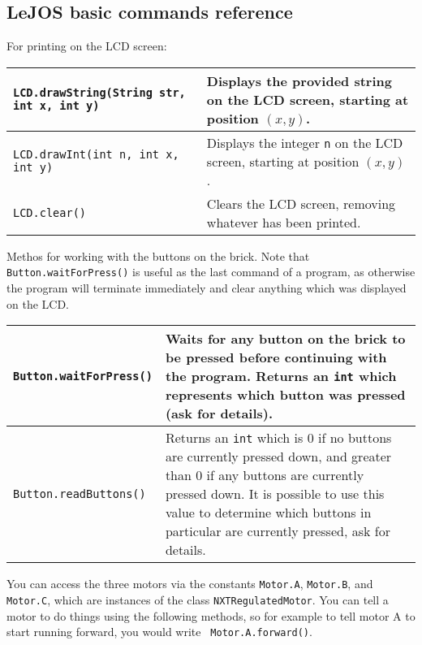 \documentclass[11pt]{article}
\theoremstyle{plain}
\theoremstyle{definition}
\theoremstyle{remark}
\begin{document}
\begin{center}
\section*{LeJOS basic commands reference}
\end{center}
For printing on the LCD screen:
\begin{center}
  \begin{tabular}{|l|p{20em}|}
    \hline
    {\tt LCD.drawString(String str, int x, int y)} & Displays the provided
    string on the LCD screen, starting at position $(x, y)$. \\\hline
    {\tt LCD.drawInt(int n, int x, int y)} & Displays the integer {\tt n} on the
    LCD screen, starting at position $(x, y)$. \\\hline
    {\tt LCD.clear()} & Clears the LCD screen, removing whatever has been
    printed. \\\hline
  \end{tabular}
\end{center}
Methos for working with the buttons on the brick. Note that {\tt
Button.waitForPress()} is useful as the last command of a program, as otherwise
the program will terminate immediately and clear anything which was displayed on
the LCD.
\begin{center}
  \begin{tabular}{|l|p{20em}|}
    \hline
    {\tt Button.waitForPress()} & Waits for any button on the brick to be
    pressed before continuing with the program. Returns an {\tt int} which
    represents which button was pressed (ask for details). \\\hline
    {\tt Button.readButtons()} & Returns an {\tt int} which is $0$ if no buttons
    are currently pressed down, and greater than $0$ if any buttons are
    currently pressed down. It is possible to use this value to determine which
    buttons in particular are currently pressed, ask for details. \\\hline
  \end{tabular}
\end{center}
You can access the three motors via the constants {\tt Motor.A}, {\tt Motor.B},
and {\tt Motor.C}, which are instances of the class {\tt NXTRegulatedMotor}.
You can tell a motor to do things using the following methods, so for example to
tell motor A to start running forward, you would write {\tt
Motor.A.forward()}.
\end{document}
